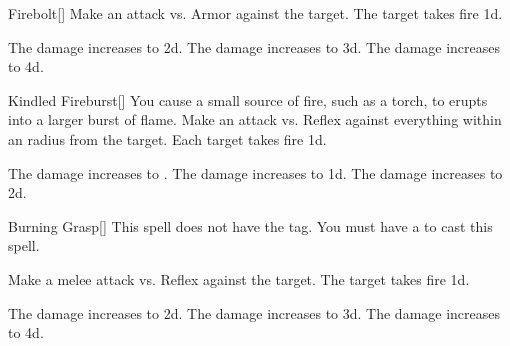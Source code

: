 \lowercase{\hypertarget{spell:Firebolt}{}}\label{spell:Firebolt}
\begin{freeability}[Rank 1]{\hypertarget{spell:Firebolt}{Firebolt}}[]
Make an attack vs. Armor against the target.
\hit The target takes fire  \plus1d.

\rankline
{} The damage increases to  \plus2d.
 The damage increases to  \plus3d.
 The damage increases to  \plus4d.

\end{freeability}
\vspace{0.25em}



\lowercase{\hypertarget{spell:Kindled Fireburst}{}}\label{spell:Kindled Fireburst}
\begin{freeability}[Rank 1]{\hypertarget{spell:Kindled Fireburst}{Kindled Fireburst}}[]
You cause a small source of fire, such as a torch, to erupts into a larger burst of flame.
Make an attack vs. Reflex against everything within an \areasmall radius from the target.
\hit Each target takes fire  \minus1d.

\rankline
{} The damage increases to .
 The damage increases to  \plus1d.
 The damage increases to  \plus2d.

\end{freeability}
\vspace{0.25em}



\lowercase{\hypertarget{spell:Burning Grasp}{}}\label{spell:Burning Grasp}
\begin{freeability}[Rank 2]{\hypertarget{spell:Burning Grasp}{Burning Grasp}}[]
This spell does not have the  tag.
You must have a  to cast this spell.

Make a melee attack vs. Reflex against the target.
\hit The target takes fire  \plus1d.

\rankline
{} The damage increases to  \plus2d.
 The damage increases to  \plus3d.
 The damage increases to  \plus4d.

\end{freeability}
\vspace{0.25em}



